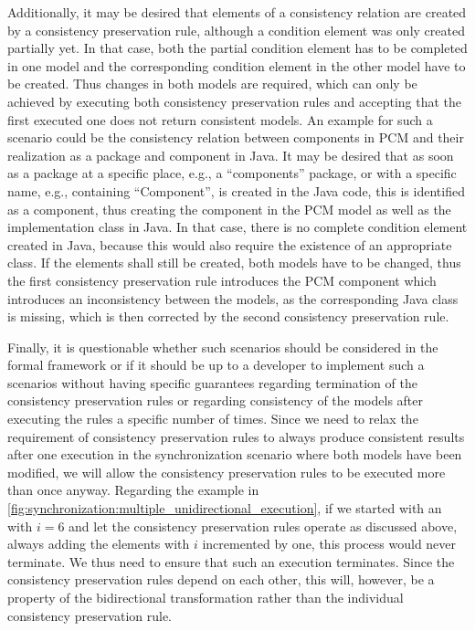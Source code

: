 Additionally, it may be desired that elements of a consistency relation are created by a consistency preservation rule, although a condition element was only created partially yet.
In that case, both the partial condition element has to be completed in one model and the corresponding condition element in the other model have to be created.
Thus changes in both models are required, which can only be achieved by executing both consistency preservation rules and accepting that the first executed one does not return consistent models.
An example for such a scenario could be the consistency relation between components in \gls{PCM} and their realization as a package and component in Java.
It may be desired that as soon as a package at a specific place, e.g., a \enquote{components} package, or with a specific name, e.g., containing \enquote{Component}, is created in the Java code, this is identified as a component, thus creating the component in the \gls{PCM} model as well as the implementation class in Java.
In that case, there is no complete condition element created in Java, because this would also require the existence of an appropriate class.
If the elements shall still be created, both models have to be changed, thus the first consistency preservation rule introduces the \gls{PCM} component which introduces an inconsistency between the models, as the corresponding Java class is missing, which is then corrected by the second consistency preservation rule.

Finally, it is questionable whether such scenarios should be considered in the formal framework or if it should be up to a developer to implement such a scenarios without having specific guarantees regarding termination of the consistency preservation rules or regarding consistency of the models after executing the rules a specific number of times.
Since we need to relax the requirement of consistency preservation rules to always produce consistent results after one execution in the synchronization scenario where both models have been modified, we will allow the consistency preservation rules to be executed more than once anyway.
Regarding the example in \autoref{fig:synchronization:multiple_unidirectional_execution}, if we started with an  with $i = 6$ and let the consistency preservation rules operate as discussed above, always adding the elements with $i$ incremented by one, this process would never terminate.
We thus need to ensure that such an execution terminates.
Since the consistency preservation rules depend on each other, this will, however, be a property of the bidirectional transformation rather than the individual consistency preservation rule.

